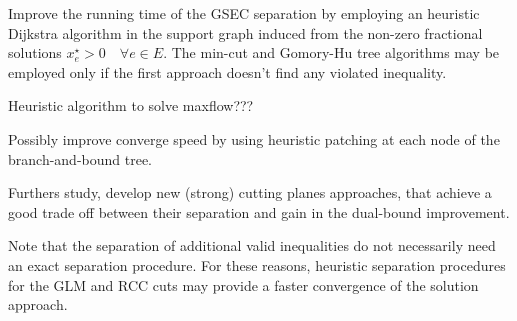 Improve the running time of the GSEC separation by employing an heuristic Dijkstra algorithm in the support graph induced from the non-zero fractional solutions $x^\star_e > 0 \quad \forall e \in E$.
The min-cut and Gomory-Hu tree algorithms may be employed only if the first approach doesn't find any violated inequality.

Heuristic algorithm to solve maxflow???

Possibly improve converge speed by using heuristic patching at each node of the branch-and-bound tree.

Furthers study, develop new (strong) cutting planes approaches, that achieve a good trade off between their separation and gain in the dual-bound improvement.

Note that the separation of additional valid inequalities do not necessarily need an exact separation procedure.
For these reasons, heuristic separation procedures for the GLM and RCC cuts may provide a faster convergence of the solution approach.
